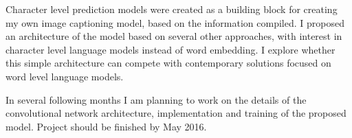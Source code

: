 Character level prediction models were created as a building block for creating my own image captioning model, based on the information compiled. I proposed an architecture of the model based on several other approaches, with interest in character level language models instead of word embedding. I explore whether this simple architecture can compete with contemporary solutions focused on word level language models.

In several following months I am planning to work on the details of the convolutional network architecture, implementation and training of the proposed model. Project should be finished by May 2016.


